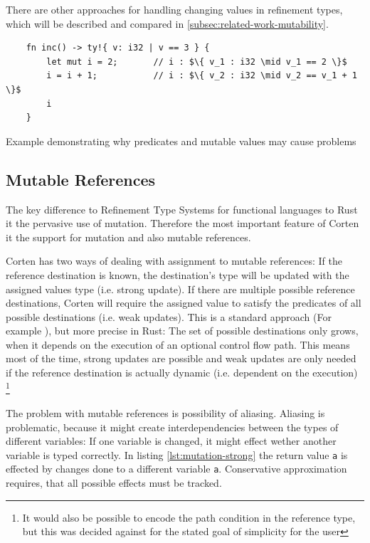 \documentclass{book}
\newcommand{\code}[1]{\texttt{#1}}
\theoremstyle{definition}
\begin{document}
There are other approaches for handling changing values in refinement types, which will be described and compared in \ref{subsec:related-work-mutability}.


\begin{listing}[ht]
  \begin{verbatim}
    fn inc() -> ty!{ v: i32 | v == 3 } {
        let mut i = 2;       // i : $\{ v_1 : i32 \mid v_1 == 2 \}$
        i = i + 1;           // i : $\{ v_2 : i32 \mid v_2 == v_1 + 1 \}$
        i
    }
  \end{verbatim}
  \caption{Example demonstrating why predicates and mutable values may cause problems}
  \label{lst:mutable-values}
\end{listing}

\label{subsec:mutable-references}\subsection{Mutable References}

The key difference to Refinement Type Systems for functional languages to Rust it the pervasive use of mutation. Therefore the most important feature of Corten it the support for mutation and also mutable references.

Corten has two ways of dealing with assignment to mutable references: If the reference destination is known, the destination's type will be updated with the assigned values type (i.e. strong update). If there are multiple possible reference destinations, Corten will require the assigned value to satisfy the predicates of all possible destinations (i.e. weak updates). This is a standard approach (For example \cite{kloos_asynchronous_2015}), but more precise in Rust: The set of possible destinations only grows, when it depends on the execution of an optional control flow path. This means most of the time, strong updates are possible and weak updates are only needed if the reference destination is actually dynamic (i.e. dependent on the execution) \footnote{It would also be possible to encode the path condition in the reference type, but this was decided against for the stated goal of simplicity for the user}

The problem with mutable references is possibility of aliasing. Aliasing is problematic, because it might create interdependencies between the types of different variables: If one variable is changed, it might effect wether another variable is typed correctly. In listing \ref{lst:mutation-strong} the return value \code{a} is effected by changes done to a different variable \code{a}. Conservative approximation requires, that all possible effects must be tracked.
\end{document}

